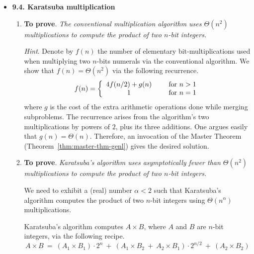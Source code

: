\begin{itemize}
\item
{\bf 9.4. Karatsuba multiplication} 

\smallskip

\begin{enumerate}
\item 
{\bf To prove}.
{\em The conventional multiplication algorithm uses $\Theta(n^2)$ multiplications to compute the product of two $n$-bit integers.}

\medskip

{\em Hint}.  Denote by $f(n)$ the number of elementary bit-multiplications used when multiplying two $n$-bits numerals via the conventional algorithm.  We show that $f(n) = \Theta(n^2)$ via the following recurrence.
\[ f(n) = \left\{
\begin{array}{cl}
4 f(n/2) + g(n) & \hspace*{.2in} \mbox{for } n > 1 \\
                    1 & \hspace*{.2in} \mbox{for } n = 1
\end{array}
\right. \]
where $g$ is the cost of the extra arithmetic operations done while merging subproblems.  The recurrence arises from the algorithm's two multiplications by powers of $2$, plus its three additions.  One argues easily that $g(n) = \Theta(n)$.  Therefore, an invocation of the Master Theorem (Theorem~\ref{thm:master-thm-genl}) gives the desired solution. 

\medskip\item
{\bf To prove}.
{\em Karatsuba's algorithm uses {\em asymptotically fewer than} $\Theta(n^2)$ multiplications to compute the product of two $n$-bit integers.}

\smallskip

We need to exhibit a (real) number $\alpha < 2$ such that Karatsuba's algorithm computes the product of two $n$-bit integers using $\Theta(n^\alpha)$ multiplications.

\medskip

Karatsuba's algorithm computes $A \times B$, where $A$ and $B$ are $n$-bit integers, via the following recipe.
\begin{equation}
\label{eq:karatsuba-normal}
A \times B \ = \ (A_1 \times B_1) \cdot 2^n \ + \  (A_1 \times B_2 \ + \ A_2 \times B_1) \cdot 2^{n/2} \ + \ (A_2 \times B_2)
\end{equation}

\smallskip


\end{enumerate}
\end{itemize}
